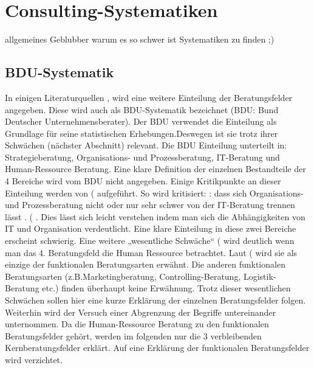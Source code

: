 \chapter{Consulting-Systematiken}
allgemeines Geblubber warum es so schwer ist Systematiken zu finden ;)
\section{BDU-Systematik}
In einigen Literaturquellen \cite[54]{Lippold201309},\cite[4]{nissen2007consulting} wird eine weitere Einteilung der Beratungsfelder angegeben. Diese wird auch als BDU-Systematik bezeichnet (BDU: Bund Deutscher Unternehmensberater). Der BDU verwendet die Einteilung als Grundlage für seine statistischen Erhebungen.Deswegen ist sie trotz ihrer Schwächen (nächster Abschnitt) relevant.
Die BDU Einteilung unterteilt in: Strategieberatung, Organisations- und Prozessberatung, IT-Beratung und Human-Ressource Beratung. Eine klare Definition der einzelnen Bestandteile der 4 Bereiche wird vom BDU nicht angegeben. Einige Kritikpunkte an dieser Einteilung werden von (\cite[54]{Lippold201309} aufgeführt. So wird kritisiert: : \glqq dass sich Organisations- und Prozessberatung nicht oder nur sehr schwer von der IT-Beratung trennen l\"asst \grqq. (\cite[54]{Lippold201309} . Dies lässt sich leicht verstehen indem man sich die Abhängigkeiten von IT und Organisation verdeutlicht. Eine klare Einteilung in diese zwei Bereiche erscheint schwierig. Eine weitere „wesentliche Schwäche“ (\cite[54]{Lippold201309}  wird deutlich wenn man das 4. Beratungsfeld die Human Ressource betrachtet. Laut (\cite[54]{Lippold201309} wird sie als einzige der funktionalen Beratungsarten erwähnt. Die anderen funktionalen Beratungsarten (z.B.Marketingberatung, Controlling-Beratung, Logistik- Beratung etc.) finden überhaupt keine Erwähnung.
Trotz dieser wesentlichen Schwächen sollen hier eine kurze Erklärung der einzelnen Beratungsfelder folgen. Weiterhin wird der Versuch einer Abgrenzung der Begriffe untereinander unternommen. Da die Human-Ressource Beratung zu den funktionalen Beratungsfelder gehört, werden im folgenden nur die 3 verbleibenden Kernberatungsfelder erklärt. Auf eine Erklärung der funktionalen Beratungsfelder wird verzichtet. 

